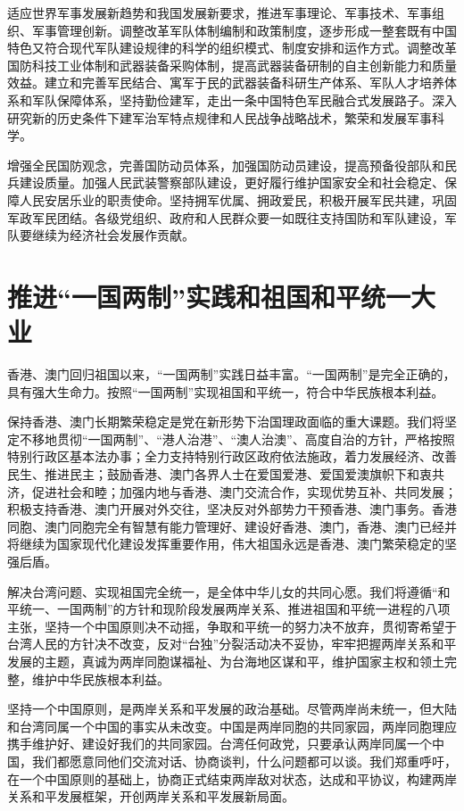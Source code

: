 适应世界军事发展新趋势和我国发展新要求，推进军事理论、军事技术、军事组织、军事管理创新。调整改革军队体制编制和政策制度，逐步形成一整套既有中国特色又符合现代军队建设规律的科学的组织模式、制度安排和运作方式。调整改革国防科技工业体制和武器装备采购体制，提高武器装备研制的自主创新能力和质量效益。建立和完善军民结合、寓军于民的武器装备科研生产体系、军队人才培养体系和军队保障体系，坚持勤俭建军，走出一条中国特色军民融合式发展路子。深入研究新的历史条件下建军治军特点规律和人民战争战略战术，繁荣和发展军事科学。

增强全民国防观念，完善国防动员体系，加强国防动员建设，提高预备役部队和民兵建设质量。加强人民武装警察部队建设，更好履行维护国家安全和社会稳定、保障人民安居乐业的职责使命。坚持拥军优属、拥政爱民，积极开展军民共建，巩固军政军民团结。各级党组织、政府和人民群众要一如既往支持国防和军队建设，军队要继续为经济社会发展作贡献。

\section{推进“一国两制”实践和祖国和平统一大业}

香港、澳门回归祖国以来，“一国两制”实践日益丰富。“一国两制”是完全正确的，具有强大生命力。按照“一国两制”实现祖国和平统一，符合中华民族根本利益。

保持香港、澳门长期繁荣稳定是党在新形势下治国理政面临的重大课题。我们将坚定不移地贯彻“一国两制”、“港人治港”、“澳人治澳”、高度自治的方针，严格按照特别行政区基本法办事；全力支持特别行政区政府依法施政，着力发展经济、改善民生、推进民主；鼓励香港、澳门各界人士在爱国爱港、爱国爱澳旗帜下和衷共济，促进社会和睦；加强内地与香港、澳门交流合作，实现优势互补、共同发展；积极支持香港、澳门开展对外交往，坚决反对外部势力干预香港、澳门事务。香港同胞、澳门同胞完全有智慧有能力管理好、建设好香港、澳门，香港、澳门已经并将继续为国家现代化建设发挥重要作用，伟大祖国永远是香港、澳门繁荣稳定的坚强后盾。

解决台湾问题、实现祖国完全统一，是全体中华儿女的共同心愿。我们将遵循“和平统一、一国两制”的方针和现阶段发展两岸关系、推进祖国和平统一进程的八项主张，坚持一个中国原则决不动摇，争取和平统一的努力决不放弃，贯彻寄希望于台湾人民的方针决不改变，反对“台独”分裂活动决不妥协，牢牢把握两岸关系和平发展的主题，真诚为两岸同胞谋福祉、为台海地区谋和平，维护国家主权和领土完整，维护中华民族根本利益。

坚持一个中国原则，是两岸关系和平发展的政治基础。尽管两岸尚未统一，但大陆和台湾同属一个中国的事实从未改变。中国是两岸同胞的共同家园，两岸同胞理应携手维护好、建设好我们的共同家园。台湾任何政党，只要承认两岸同属一个中国，我们都愿意同他们交流对话、协商谈判，什么问题都可以谈。我们郑重呼吁，在一个中国原则的基础上，协商正式结束两岸敌对状态，达成和平协议，构建两岸关系和平发展框架，开创两岸关系和平发展新局面。

